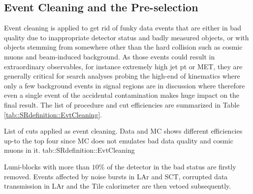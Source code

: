 \subsection{Event Cleaning and the Pre-selection} \label{sec::SRdefinition::eventCleaning}
Event cleaning is applied to get rid of funky data events that are either in bad quality due to inappropriate detector status and badly measured objects, or with objects stemming from somewhere other than the hard collision such as cosmic muons and beam-induced background. 
As those events could result in extraordinary observables, for instance extremely high jet pt or MET, they are generally critical for search analyses probing the high-end of kinematics where only a few background events in signal regions are in discussion where therefore even a single event of the accidental contamination makes huge impact on the final result. The list of procedure and cut efficiencies are summarized in Table \ref{tab::SRdefinition::EvtCleaning}. 

{List of cuts applied as event cleaning. Data and MC shows different efficiencies up-to the top four since MC does not emulates bad data quality and cosmic muons in it.}
{tab::SRdefinition::EvtCleaning}

Lumi-blocks with more than $10\%$ of the detector in the bad status are firstly removed. 
Events affected by noise bursts in LAr and SCT,  corrupted data transmission in LAr and the Tile calorimeter are then vetoed subsequently. 

